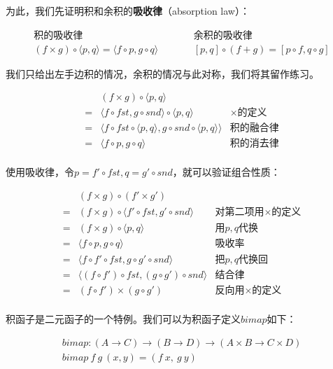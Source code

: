 \documentclass{article}
\begin{document}
为此，我们先证明积和余积的\textbf{吸收律}（absorption law）：

\[
\begin{array}{ccc}
  \text{积的吸收律} & \quad \quad & \text{余积的吸收律} \\
  (f \times g) \circ \langle p, q \rangle = \langle f \circ p, g \circ q \rangle
  & \quad \quad &
  [p, q] \circ (f + g) = [p \circ f, q \circ g]
\end{array}
\]

我们只给出左手边积的情况，余积的情况与此对称，我们将其留作练习。

\[
\begin{array}{cll}
   & (f \times g) \circ \langle p, q \rangle & \\
 = & \langle f \circ fst, g \circ snd \rangle \circ \langle p, q \rangle & \text{$\times$的定义} \\
 = & \langle f \circ fst \circ \langle p, q \rangle, g \circ snd \circ \langle p, q \rangle \rangle & \text{积的融合律} \\
 = & \langle f \circ p, g \circ q \rangle & \text{积的消去律} \\
\end{array}
\]

使用吸收律，令$p = f' \circ fst, q = g' \circ snd$，就可以验证组合性质：

\[
\begin{array}{cll}
  & (f \times g) \circ (f' \times g') & \\
= & (f \times g) \circ \langle f' \circ fst, g' \circ snd \rangle & \text{对第二项用$\times$的定义} \\
= & (f \times g) \circ \langle p, q \rangle & \text{用$p, q$代换} \\
= & \langle f \circ p, g \circ q \rangle & \text{吸收率} \\
= & \langle f \circ f' \circ fst, g \circ g' \circ snd \rangle & \text{把$p, q$代换回} \\
= & \langle (f \circ f') \circ fst, (g \circ g') \circ snd \rangle & \text{结合律} \\
= & (f \circ f') \times (g \circ g') & \text{反向用$\times$的定义} \\
\end{array}
\]

积函子是二元函子的一个特例。我们可以为积函子定义$bimap$如下：

\[
\begin{array}{l}
bimap : (A \to C) \to (B \to D) \to (A \times B \to C \times D) \\
bimap\ f\ g\ (x, y) = (f\ x,\ g\ y)
\end{array}
\]
\end{document}
